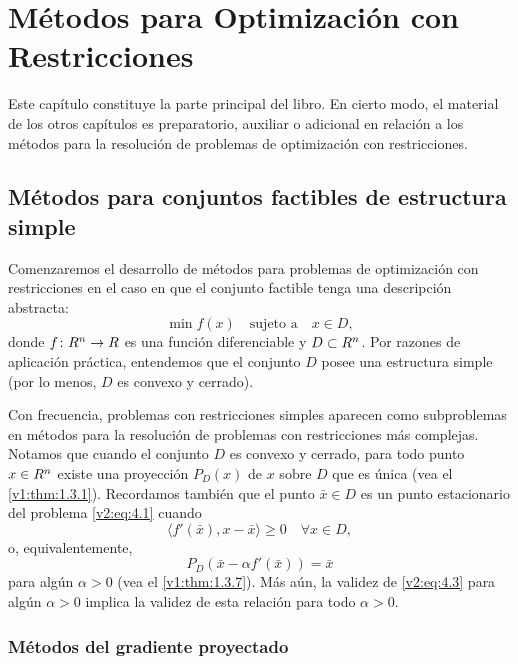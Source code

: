 
\chapter{Métodos para Optimización con Restricciones}

Este capítulo constituye la parte principal del libro. En cierto modo, el material de los otros capítulos es preparatorio, auxiliar o adicional en relación a los métodos para la resolución de problemas de optimización con restricciones.

\section{Métodos para conjuntos factibles de estructura simple}

Comenzaremos el desarrollo de métodos para problemas de optimización con restricciones en el caso en que el conjunto factible tenga una descripción abstracta:
\begin{equation}
    \min f(x) \quad \text{sujeto a} \quad x \in D,
    \label{v2:eq:4.1}
\end{equation}
donde $f \colon R^n \to R$ es una función diferenciable y $D \subset R^n$. Por razones de aplicación práctica, entendemos que el conjunto $D$ posee una estructura simple (por lo menos, $D$ es convexo y cerrado).

Con frecuencia, problemas con restricciones simples aparecen como subproblemas en métodos para la resolución de problemas con restricciones más complejas. Notamos que cuando el conjunto $D$ es convexo y cerrado, para todo punto $x \in R^n$ existe una proyección $P_D(x)$ de $x$ sobre $D$ que es única (vea el \cref{v1:thm:1.3.1}). Recordamos también que el punto $\bar{x} \in D$ es un punto estacionario del problema \eqref{v2:eq:4.1} cuando
\begin{equation}
    \langle f'(\bar{x}), x - \bar{x} \rangle \ge 0 \quad \forall x \in D,
    \label{v2:eq:4.2}
\end{equation}
o, equivalentemente,
\begin{equation}
    P_D(\bar{x} - \alpha f'(\bar{x})) = \bar{x}
    \label{v2:eq:4.3}
\end{equation}
para algún $\alpha > 0$ (vea el \cref{v1:thm:1.3.7}). Más aún, la validez de \eqref{v2:eq:4.3} para algún $\alpha > 0$ implica la validez de esta relación para todo $\alpha > 0$.

\subsection{Métodos del gradiente proyectado}

